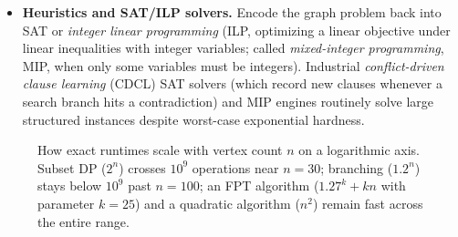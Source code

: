 \begin{itemize}
  \item \textbf{Heuristics and SAT/ILP solvers.} Encode the graph problem back into \textsc{SAT} or \emph{integer linear programming} (ILP, optimizing a linear objective under linear inequalities with integer variables; called \emph{mixed-integer programming}, MIP, when only some variables must be integers). Industrial \emph{conflict-driven clause learning} (CDCL) SAT solvers (which record new clauses whenever a search branch hits a contradiction) and MIP engines routinely solve large structured instances despite worst-case exponential hardness.
\end{itemize}

\begin{figure}[htbp]
\centering
{}
\caption{How exact runtimes scale with vertex count $n$ on a logarithmic axis. Subset DP ($2^n$) crosses $10^9$ operations near $n=30$; branching ($1.2^n$) stays below $10^9$ past $n=100$; an FPT algorithm ($1.27^k+kn$ with parameter $k=25$) and a quadratic algorithm ($n^2$) remain fast across the entire range.}
\label{ch37:fig-growth-rates}
\end{figure}

